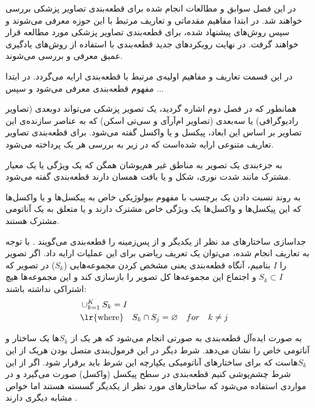 

در این فصل سوابق و مطالعات انجام شده برای قطعه‌بندی تصاویر پزشکی بررسی خواهند شد. در ابتدا مفاهیم مقدماتی و تعاریف مرتبط با این حوزه معرفی می‌شوند و سپس روش‌های پیشنهاد شده، برای قطعه‌بندی تصاویر پزشکی مورد مطالعه قرار خواهند گرفت. در نهایت رویکردهای جدید قطعه‌بندی با استفاده از روش‌‌های یادگیری عمیق معرفی و بررسی می‌شوند.

در این قسمت تعاریف و مفاهیم اولیه‌ی مرتبط با قطعه‌بندی ارایه می‌گردد. در ابتدا مفهوم قطعه‌بندی معرفی می‌شود و سپس ...

همانطور که در فصل دوم اشاره گردید، یک تصویر پزشکی می‌تواند دوبعدی (تصاویر رادیوگرافی) یا سه‌بعدی (تصاویر ام‌آرآی و سی‌تی اسکن) که به عناصر سازنده‌ی این تصاویر بر اساس این ابعاد، پیکسل و یا واکسل گفته می‌شود. برای قطعه‌بندی تصاویر تعاریف متنوعی ارایه شده‌است که در زیر به بررسی هر یک پرداخته می‌شود.

 به جزء‌بندی یک تصویر به مناطق غیر هم‌پوشان همگن که یک ویژگی یا یک معیار مشترک مانند شدت نوری، شکل و یا بافت همسان دارند قطعه‌بندی گفته می‌شود.

 به روند نسبت دادن یک برچسب با مفهوم بیولوژیکی خاص به پیکسل‌ها و یا واکسل‌ها که این پیکسل‌ها و واکسل‌ها یک ویژگی خاص مشترک دارند و یا متعلق به یک آناتومی مشترک هستند. 

 جداسازی ساختارهای مد نظر از یکدیگر و از پس‌زمینه را قطعه‌بندی می‌گویند .
با توجه به تعاریف انجام شده، می‌توان یک تعریف ریاضی برای این عملیات ارایه داد. اگر تصویر را $I$ بنامیم، آنگاه قطعه‌بندی یعنی مشخص کردن مجموعه‌هایی ($S_{k}$) در تصویر که $S_{k} \subset I$ و اجتماع این مجموعه‌ها کل تصویر را بازسازی کند و این مجموعه‌ها هیچ اشتراکی نداشته باشند:
\begin{alignat}{5}
	 &\cup_{k=1}^{K} S_{k} = I     \label{seg_def} && \\
	 &\text{\lr{where}} \quad S_{k} \cap S_{j} = \varnothing \quad for \quad k \neq j && \notag
\end{alignat}

به صورت ایده‌آل قطعه‌بندی به صورتی انجام می‌شود که هر یک از $S_{k}$ها یک ساختار و آناتومی خاص را نشان می‌دهد. شرط دیگر در این فرمول‌بندی متصل بودن هریک از این $S_{k}$هاست که برای ساختارهای آناتومیکی یکپارچه این شرط باید برقرار شود. اگر از این شرط چشم‌پوشی کنیم قطعه‌بندی در سطح پیکسل (واکسل) صورت می‌گیرد و در مواردی استفاده می‌شود که ساختارهای مورد نظر از یکدیگر گسسته هستند اما خواص مشابه دیگری دارند . 

